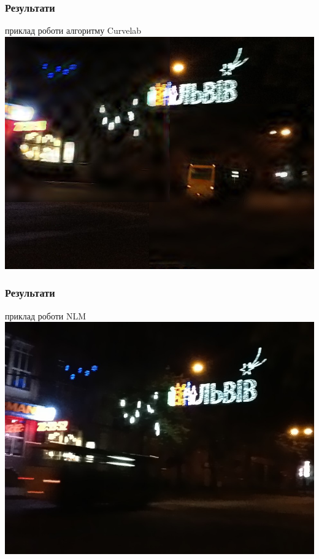 \documentclass[12pt]{beamer}
\begin{document}
\begin{frame}\frametitle{ Результати}
	приклад роботи алгоритму Curvelab
	\includegraphics[scale=0.3]{images/lviv_curvelet}
\end{frame}
\begin{frame}\frametitle{ Результати}
	приклад роботи NLM
	\includegraphics[scale=0.3]{images/lviv_nlm}
\end{frame}
\end{document}
